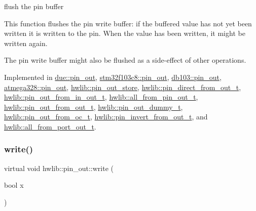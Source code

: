 flush the pin buffer

This function flushes the pin write buffer\+: if the buffered value has not yet been written it is written to the pin. When the value has been written, it might be written again.

The pin write buffer might also be flushed as a side-\/effect of other operations. 

Implemented in \hyperlink{classdue_1_1pin__out_a3db1935f691af312853dc2ebe06a56fb}{due\+::pin\+\_\+out}, \hyperlink{classstm32f103c8_1_1pin__out_a401a547302edb7ceb655e5d4be0af6a8}{stm32f103c8\+::pin\+\_\+out}, \hyperlink{classdb103_1_1pin__out_ad94271fe261522bf18b35e084076c12d}{db103\+::pin\+\_\+out}, \hyperlink{classatmega328_1_1pin__out_a12371a15efd326dc559301a0751b899e}{atmega328\+::pin\+\_\+out}, \hyperlink{classhwlib_1_1pin__out__store_a795292c741832d0cedb63b9333ef224f}{hwlib\+::pin\+\_\+out\+\_\+store}, \hyperlink{classhwlib_1_1pin__direct__from__out__t_af623d47b7d7b8b0878a9ac359a3668d8}{hwlib\+::pin\+\_\+direct\+\_\+from\+\_\+out\+\_\+t}, \hyperlink{classhwlib_1_1pin__out__from__in__out__t_a7b2e19b1916d922557ab2881b92085f3}{hwlib\+::pin\+\_\+out\+\_\+from\+\_\+in\+\_\+out\+\_\+t}, \hyperlink{classhwlib_1_1all__from__pin__out__t_ad051258aabc84d5bc50bba6addb8d12c}{hwlib\+::all\+\_\+from\+\_\+pin\+\_\+out\+\_\+t}, \hyperlink{classhwlib_1_1pin__out__from__out__t_ac3a382842264da94644aeb2d8981ffd4}{hwlib\+::pin\+\_\+out\+\_\+from\+\_\+out\+\_\+t}, \hyperlink{classhwlib_1_1pin__out__dummy__t_ac8513bd390f0315c544f8c2e299df3d6}{hwlib\+::pin\+\_\+out\+\_\+dummy\+\_\+t}, \hyperlink{classhwlib_1_1pin__out__from__oc__t_ae233e9c1b5f91ab242ca3611422de19c}{hwlib\+::pin\+\_\+out\+\_\+from\+\_\+oc\+\_\+t}, \hyperlink{classhwlib_1_1pin__invert__from__out__t_acb6c624010c503c5703c7fb7ec771619}{hwlib\+::pin\+\_\+invert\+\_\+from\+\_\+out\+\_\+t}, and \hyperlink{classhwlib_1_1all__from__port__out__t_aa98ee6cecc0f87b153f5aea8b2967f21}{hwlib\+::all\+\_\+from\+\_\+port\+\_\+out\+\_\+t}.

\mbox{\label{classhwlib_1_1pin__out_a8d260a70e503dcfb81987c408e170300}} 
\subsubsection{\texorpdfstring{write()}{write()}}
{\footnotesize\ttfamily virtual void hwlib\+::pin\+\_\+out\+::write (\begin{DoxyParamCaption}\item[{bool}]{x }\end{DoxyParamCaption})\hspace{0.3cm}{\ttfamily [pure virtual]}}





